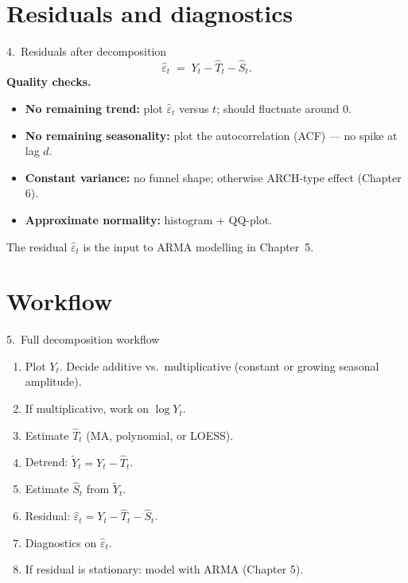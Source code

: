 \documentclass[aspectratio=169]{beamer}
\begin{document}
\section{Residuals and diagnostics}

\begin{frame}{4.~Residuals after decomposition}
  \[
    \widehat{\varepsilon}_t \;=\; Y_t - \widehat{T}_t - \widehat{S}_t.
  \]
  \medskip
  \textbf{Quality checks.}
  \begin{itemize}
    \item \textbf{No remaining trend:} plot $\widehat{\varepsilon}_t$
          versus $t$; should fluctuate around $0$.
    \item \textbf{No remaining seasonality:} plot the autocorrelation
          (ACF) — no spike at lag $d$.
    \item \textbf{Constant variance:} no funnel shape; otherwise
          ARCH-type effect (Chapter 6).
    \item \textbf{Approximate normality:} histogram + QQ-plot.
  \end{itemize}
  \medskip
  \begin{infobox}
    The residual $\widehat{\varepsilon}_t$ is the input to ARMA modelling
    in Chapter~5.
  \end{infobox}
\end{frame}

\section{Workflow}

\begin{frame}{5.~Full decomposition workflow}
  \begin{enumerate}
    \item Plot $Y_t$. Decide additive vs.\ multiplicative
          (constant or growing seasonal amplitude).
    \item If multiplicative, work on $\log Y_t$.
    \item Estimate $\widehat{T}_t$ (MA, polynomial, or LOESS).
    \item Detrend: $\widetilde{Y}_t = Y_t - \widehat{T}_t$.
    \item Estimate $\widehat{S}_t$ from $\widetilde{Y}_t$.
    \item Residual: $\widehat{\varepsilon}_t = Y_t - \widehat{T}_t - \widehat{S}_t$.
    \item Diagnostics on $\widehat{\varepsilon}_t$.
    \item If residual is stationary: model with ARMA (Chapter 5).
  \end{enumerate}
\end{frame}
\end{document}
